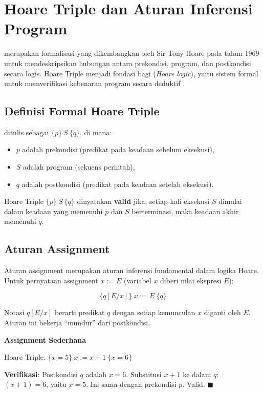 \section{Hoare Triple dan Aturan Inferensi Program}

 merupakan formalisasi yang dikembangkan oleh Sir Tony Hoare pada tahun 1969 untuk mendeskripsikan hubungan antara prekondisi, program, dan postkondisi secara logis. Hoare Triple menjadi fondasi bagi  (\textit{Hoare logic}), yaitu sistem formal untuk memverifikasi kebenaran program secara deduktif \cite{hoare1969}.

\subsection{Definisi Formal Hoare Triple}

\begin{definisi}
 ditulis sebagai $\{p\}\ S\ \{q\}$, di mana:
\begin{itemize}
    \item $p$ adalah prekondisi (predikat pada keadaan sebelum eksekusi),
    \item $S$ adalah program (sekuens perintah),
    \item $q$ adalah postkondisi (predikat pada keadaan setelah eksekusi).
\end{itemize}
Hoare Triple $\{p\}\ S\ \{q\}$ dinyatakan \textbf{valid} jika: setiap kali eksekusi $S$ dimulai dalam keadaan yang memenuhi $p$ dan $S$ berterminasi, maka keadaan akhir memenuhi $q$.
\end{definisi}

\subsection{Aturan Assignment}

Aturan assignment merupakan aturan inferensi fundamental dalam logika Hoare. Untuk pernyataan assignment $x := E$ (variabel $x$ diberi nilai ekspresi $E$):

\[ \{q[E/x]\}\ x := E\ \{q\} \]

Notasi $q[E/x]$ berarti predikat $q$ dengan setiap kemunculan $x$ diganti oleh $E$. Aturan ini bekerja ``mundur'' dari postkondisi.

\begin{contoh}
\textbf{Assignment Sederhana}

Hoare Triple: $\{x = 5\}\ x := x + 1\ \{x = 6\}$

\textbf{Verifikasi}: Postkondisi $q$ adalah $x = 6$. Substitusi $x + 1$ ke dalam $q$: $(x + 1) = 6$, yaitu $x = 5$. Ini sama dengan prekondisi $p$. Valid. $\blacksquare$
\end{contoh}

